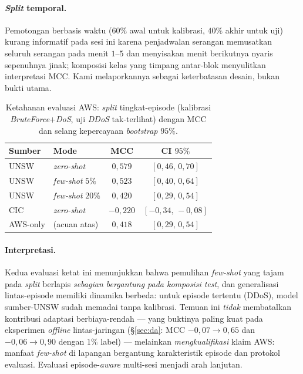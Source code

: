 \documentclass[11pt,a4paper]{article}
\begin{document}
\paragraph{\emph{Split} temporal.} Pemotongan berbasis waktu ($60\%$ awal untuk kalibrasi,
$40\%$ akhir untuk uji) kurang informatif pada sesi ini karena penjadwalan serangan
memusatkan seluruh serangan pada menit $1$--$5$ dan menyisakan menit berikutnya nyaris
sepenuhnya jinak; komposisi kelas yang timpang antar-blok menyulitkan interpretasi MCC.
Kami melaporkannya sebagai keterbatasan desain, bukan bukti utama.

\begin{table}[h]
\centering
\caption{Ketahanan evaluasi AWS: \emph{split} tingkat-episode (kalibrasi
\emph{BruteForce}$+$\emph{DoS}, uji \emph{DDoS} tak-terlihat) dengan MCC dan selang
kepercayaan \emph{bootstrap} $95\%$.}
\label{tab:rt-robust}
\small
\begin{tabular}{llcc}
\toprule
Sumber & Mode & MCC & CI $95\%$ \\
\midrule
UNSW & \emph{zero-shot}        & $0{,}579$  & $[0{,}46,\,0{,}70]$ \\
UNSW & \emph{few-shot} $5\%$   & $0{,}523$  & $[0{,}40,\,0{,}64]$ \\
UNSW & \emph{few-shot} $20\%$  & $0{,}420$  & $[0{,}29,\,0{,}54]$ \\
CIC  & \emph{zero-shot}        & $-0{,}220$ & $[-0{,}34,\,-0{,}08]$ \\
\midrule
AWS-only & (acuan atas)        & $0{,}418$  & $[0{,}29,\,0{,}54]$ \\
\bottomrule
\end{tabular}
\end{table}

\paragraph{Interpretasi.} Kedua evaluasi ketat ini menunjukkan bahwa pemulihan
\emph{few-shot} yang tajam pada \emph{split} berlapis \emph{sebagian bergantung pada
komposisi \emph{test}}, dan generalisasi lintas-episode memiliki dinamika berbeda: untuk
episode tertentu (DDoS), model sumber-UNSW sudah memadai tanpa kalibrasi. Temuan ini
\emph{tidak} membatalkan kontribusi adaptasi berbiaya-rendah --- yang buktinya paling
kuat pada eksperimen \emph{offline} lintas-jaringan (\S\ref{sec:da}: MCC $-0{,}07\to0{,}65$
dan $-0{,}06\to0{,}90$ dengan $1\%$ label) --- melainkan \emph{mengkualifikasi} klaim AWS:
manfaat \emph{few-shot} di lapangan bergantung karakteristik episode dan protokol
evaluasi. Evaluasi episode-\emph{aware} multi-sesi menjadi arah lanjutan.
\end{document}
